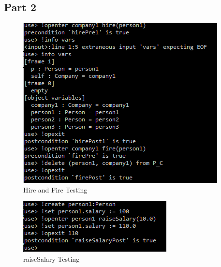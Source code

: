 \documentclass{article}
\begin{document}
\subsection*{Part 2}
\begin{figure}
	\includegraphics[width=\linewidth]{soil1.PNG}
	\caption{Hire and Fire Testing}
	\label{fig:seq}
\end{figure}

\begin{figure}
	\includegraphics[width=\linewidth]{soil2.PNG}
	\caption{raiseSalary Testing}
	\label{fig:seq}
\end{figure}
\end{document}
